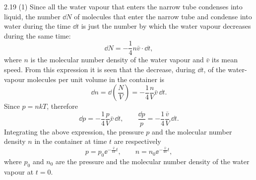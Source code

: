 \begin{solution}{2.19}
(1) Since all the water vapour that enters the narrow tube condenses into liquid, the number
$\dd N$ of molecules that enter the narrow tube and condense into water during the time $\dd t$
is just the number by which the water vapour decreases during the same time:
\begin{equation*}
\dd N = -\frac{1}{4}n\bar{v}\cdot\dd t,
\end{equation*}
where $n$ is the molecular number density of the water vapour and $\bar{v}$ its mean speed. From
this expression it is seen that the decrease, during $\dd t$, of the water-vapour molecules per
unit volume in the container is
\begin{equation*}
\dd n = \dd\left(\frac{N}{V}\right) = -\frac{1}{4}\frac{n}{V}\bar{v}\,\dd t .
\end{equation*}
Since $p=nkT$, therefore
\begin{equation*}
\dd p = -\frac{1}{4}\frac{p}{V}\bar{v}\,\dd t,\qquad
\frac{\dd p}{p} = -\frac{1}{4}\frac{\bar{v}}{V}\,\dd t .
\end{equation*}
Integrating the above expression, the pressure $p$ and the molecular number density $n$ in the
container at time $t$ are respectively
\begin{equation*}
p = p_0\ee^{-\frac{\bar{v}}{4V}t},\qquad
n = n_0\ee^{-\frac{\bar{v}}{4V}t},
\end{equation*}
where $p_0$ and $n_0$ are the pressure and the molecular number density of the water vapour at
$t=0$.


\end{solution}
